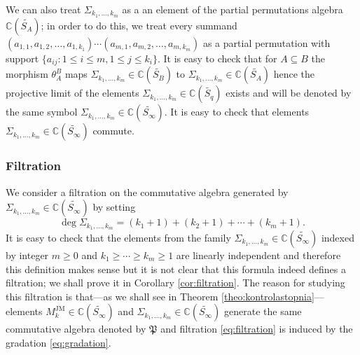\documentclass[12pt,dvips]{amsart}
\numberwithin{equation}{section} \numberwithin{figure}{section}
\theoremstyle{plain}
\newtheorem{proposition}[lemma]{Proposition}
\theoremstyle{definition}
\theoremstyle{remark}
\newcommand{\C}{{\mathbb{C}}}
\newcommand{\Sn}[1]{{{S}}_{#1}}
\newcommand{\MJM}{M^{\JM}}
\newcommand{\PartPerm}[1]{\widetilde{\Sn{#1}}}
\newcommand{\myalgebra}{\mathfrak{P}}
\DeclareMathOperator{\JM}{JM}
\begin{document}
We can also treat $\Sigma_{k_1,\dots,k_m}$ as a an element of the
partial permutations algebra $\C(\PartPerm{A})$; in order to do
this, we treat every summand $(a_{1,1},a_{1,2},\dots,a_{1,{k_1}})
\cdots (a_{m,1},a_{m,2},\dots,a_{m,k_m})$ as a partial permutation
with support $\{ a_{ij} : 1\leq i\leq m, 1\leq j\leq {k_i}  \}$. It
is easy to check that for $A\subseteq B$ the morphism $\theta^B_A$
maps $\Sigma_{k_1,\dots,k_m}\in\C(\PartPerm{B})$ to
$\Sigma_{k_1,\dots,k_m}\in\C(\PartPerm{A})$ hence the projective
limit of the elements $\Sigma_{k_1,\dots,k_m}\in\C(\PartPerm{q})$
exists and will be denoted by the same symbol
$\Sigma_{k_1,\dots,k_m}\in\C(\PartPerm{\infty})$. It is easy to
check that elements $\Sigma_{k_1,\dots,k_m}\in\C(\PartPerm{\infty})$
commute.

%
%


\subsubsection{Filtration}

We consider a filtration  on the commutative
algebra generated by
$\Sigma_{k_1,\dots,k_m}\in\C(\PartPerm{\infty})$ by setting
\begin{equation}
\label{eq:filtration} \deg
\Sigma_{k_1,\dots,k_m}=(k_1+1)+(k_2+1)+\cdots+(k_m+1).
\end{equation}
It is easy to check that the elements from the family
$\Sigma_{k_1,\dots,k_m}\in\C(\PartPerm{\infty})$ indexed by integer
$m\geq 0$ and $k_1\geq \cdots \geq k_m\geq 1$ are linearly
independent and therefore this definition makes sense but it is not
clear that this formula indeed defines a filtration; we shall prove
it in Corollary \ref{cor:filtration}. The reason for studying this
filtration is that---as we shall see in Theorem
\ref{theo:kontrolastopnia}---elements
$\MJM_k\in\C(\PartPerm{\infty})$ and
$\Sigma_{k_1,\dots,k_m}\in\C(\PartPerm{\infty})$ generate the same
commutative algebra denoted by $\myalgebra$ and filtration
\eqref{eq:filtration} is induced by the gradation
\eqref{eq:gradation}.
\end{document}
